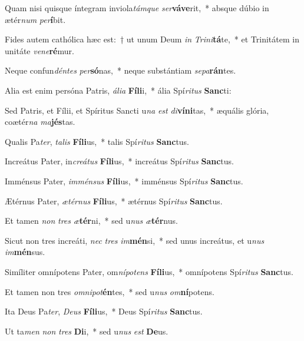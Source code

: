 \item Quam nisi quisque íntegram inviola\textit{tám}\textit{que} \textit{ser}\textbf{vá}\textbf{ve}rit,~* absque dúbio in ætér\textit{num} \textit{per}\textbf{í}bit.
\item Fides autem cathólica hæc est:~† ut unum Deum \textit{in} \textit{Tri}\textit{ni}\textbf{tá}te,~* et Trinitátem in unitáte \textit{ve}\textit{ne}\textbf{ré}mur.
\item Neque confun\textit{dén}\textit{tes} \textit{per}\textbf{só}nas,~* neque substántiam \textit{se}\textit{pa}\textbf{rán}tes.
\item Alia est enim persóna Patris, \textit{á}\textit{li}\textit{a} \textbf{Fí}\textbf{li}i,~* ália Spí\textit{ri}\textit{tus} \textbf{Sanc}ti:
\item Sed Patris, et Fílii, et Spíritus Sancti u\textit{na} \textit{est} \textit{di}\textbf{ví}\textbf{ni}tas,~* æquális glória, coætér\textit{na} \textit{ma}\textbf{jés}tas.
\item Qualis Pa\textit{ter}, \textit{ta}\textit{lis} \textbf{Fí}\textbf{li}us,~* talis Spí\textit{ri}\textit{tus} \textbf{Sanc}tus.
\item Increátus Pater, in\textit{cre}\textit{á}\textit{tus} \textbf{Fí}\textbf{li}us,~* increátus Spí\textit{ri}\textit{tus} \textbf{Sanc}tus.
\item Imménsus Pater, \textit{im}\textit{mén}\textit{sus} \textbf{Fí}\textbf{li}us,~* imménsus Spí\textit{ri}\textit{tus} \textbf{Sanc}tus.
\item Ætérnus Pater, \textit{æ}\textit{tér}\textit{nus} \textbf{Fí}\textbf{li}us,~* ætérnus Spí\textit{ri}\textit{tus} \textbf{Sanc}tus.
\item Et tamen \textit{non} \textit{tres} \textit{æ}\textbf{tér}ni,~* sed u\textit{nus} \textit{æ}\textbf{tér}nus.
\item Sicut non tres increáti, \textit{nec} \textit{tres} \textit{im}\textbf{mén}si,~* sed unus increátus, et u\textit{nus} \textit{im}\textbf{mén}sus.
\item Simíliter omnípotens Pater, om\textit{ní}\textit{pot}\textit{ens} \textbf{Fí}\textbf{li}us,~* omnípotens Spí\textit{ri}\textit{tus} \textbf{Sanc}tus.
\item Et tamen non tres \textit{om}\textit{ni}\textit{pot}\textbf{én}tes,~* sed u\textit{nus} \textit{om}\textbf{ní}potens.
\item Ita Deus Pa\textit{ter}, \textit{De}\textit{us} \textbf{Fí}\textbf{li}us,~* Deus Spí\textit{ri}\textit{tus} \textbf{Sanc}tus.
\item Ut ta\textit{men} \textit{non} \textit{tres} \textbf{Di}i,~* sed u\textit{nus} \textit{est} \textbf{De}us.
